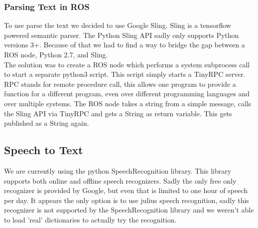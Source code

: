 \documentclass[main.tex]{subfiles}
\begin{document}
		\subsubsection{Parsing Text in ROS}
		To use parse the text we decided to use Google Sling. Sling is a tensorflow powered semantic parser. The Python Sling API sadly only supports Python versions 3+. Because of that we had to find a way to bridge the gap between a ROS node, Python 2.7, and Sling.\\
		The solution was to create a ROS node which performs a system subprocess call to start a separate python3 script. This script simply starts a TinyRPC server. RPC stands for remote procedure call, this allows one program to provide a function for a different program, even over different programming languages and over multiple systems. The ROS node takes a string from a simple message, calls the Sling API via TinyRPC and gets a String as return variable. This gets published as a String again.
		
		\subsection{Speech to Text}
		We are currently using the python SpeechRecognition library. This library supports both online and offline speech recognizers. Sadly the only free only recognizer is provided by Google, but even that is limited to one hour of speech per day. 
		It appears the only option is to use julius speech recognition, sadly this recognizer is not supported by the SpeechRecognition library and we weren't able to load 'real' dictionaries to actually try the recognition.
\end{document}
